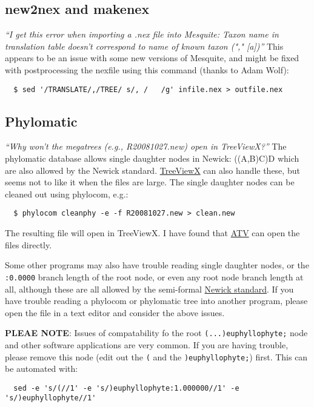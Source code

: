 \documentclass[12pt,letterpaper]{article}
\begin{document}
\subsection{new2nex and makenex}

\textit{``I get this error when importing a .nex file into Mesquite:
Taxon name in translation table doesn't correspond to name of
known taxon ("," [a])''}  This appears to be an issue with some
new versions of Mesquite, and might be fixed with postprocessing the
nexfile using this command (thanks to Adam Wolf):
\begin{verbatim}
  $ sed '/TRANSLATE/,/TREE/ s/, /   /g' infile.nex > outfile.nex
\end{verbatim}


\subsection{Phylomatic}

\textit{``Why won't the megatrees (e.g., R20081027.new) open in
  TreeViewX?''} The phylomatic database allows single daughter nodes
in Newick: ((A,B)C)D which are also allowed by the Newick standard.
\href{http://darwin.zoology.gla.ac.uk/~rpage/treeviewx/}{TreeViewX}
can also handle these, but seems not to like it when the files are
large.  The single daughter nodes can be cleaned out using phylocom,
e.g.:
\begin{verbatim}
  $ phylocom cleanphy -e -f R20081027.new > clean.new
\end{verbatim}
The resulting file will open in TreeViewX.  I have found that
\href{http://www.phylosoft.org/atv/}{ATV} can open the
files directly.  

Some other programs may also have trouble reading single daughter
nodes, or the \texttt{:0.0000} branch length of the root node, or even
any root node branch length at all, although these are all allowed by
the semi-formal \href{http://evolution.genetics.washington.edu/phylip/newick_doc.html}{Newick
  standard}. If
you have trouble reading a phylocom or phylomatic tree into another
program, please open the file in a text editor and consider the above
issues.

{\bf PLEAE NOTE}: Issues of compatability fo the root
\verb|(...)euphyllophyte;| node and other software applications are
very common.  If you are having trouble, please remove this node
(edit out the \verb|(| and the \verb|)euphyllophyte;|) first. This can
be automated with:

\begin{footnotesize}
\begin{verbatim}
  sed -e 's/(//1' -e 's/)euphyllophyte:1.000000//1' -e 's/)euphyllophyte//1'
\end{verbatim}
\end{footnotesize}
\end{document}
